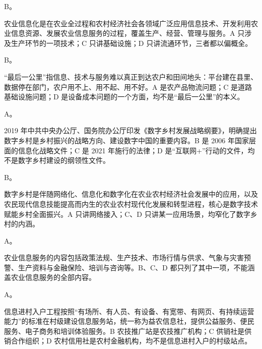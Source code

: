\documentclass[a4paper,11pt]{article}
\begin{document}


\q B。\begin{analysis}农业信息化是在农业全过程和农村经济社会各领域广泛应用信息技术、开发利用农业信息资源、发展农业信息服务的过程，覆盖生产、经营、管理与服务。A 只涉及生产环节的一项技术；C 只讲基础设施；D 只讲流通环节，三者都以偏概全。\end{analysis}

\q B。\begin{analysis}“最后一公里”指信息、技术与服务难以真正到达农户和田间地头：平台建在县里、数据停在部门，农户用不上、用不起、用不好。A 是农产品物流问题；C 是道路基础设施问题；D 是设备成本问题的一个方面，均不是“最后一公里”的本义。\end{analysis}

\q A。\begin{analysis}2019 年中共中央办公厅、国务院办公厅印发《数字乡村发展战略纲要》，明确提出数字乡村是乡村振兴的战略方向、建设数字中国的重要内容。B 是 2006 年国家层面的信息化战略文件；C 是 2021 年施行的法律；D 是“互联网+”行动的文件，均不是数字乡村建设的纲领性文件。\end{analysis}

\q B。\begin{analysis}数字乡村是伴随网络化、信息化和数字化在农业农村经济社会发展中的应用，以及农民现代信息技能提高而内生的农业农村现代化发展和转型进程，核心是数字技术赋能乡村全面振兴。A 只讲网络接入；C、D 只讲某一应用场景，均窄化了数字乡村的内涵。\end{analysis}

\q A。\begin{analysis}农业信息服务的内容包括政策法规、生产技术、市场行情与供求、气象与灾害预警、生产资料与金融保险、培训与咨询等。B、C、D 都只列了其中一项，不能涵盖农业信息服务的全部内容。\end{analysis}

\q A。\begin{analysis}信息进村入户工程按照“有场所、有人员、有设备、有宽带、有网页、有持续运营能力”的标准在村级建设信息服务站，统一称为益农信息社，提供公益服务、便民服务、电子商务和培训体验服务。B 农技推广站是农技推广机构；C 供销社是供销合作组织；D 农村信用社是农村金融机构，均不是信息进村入户的村级站点。\end{analysis}
\end{document}
